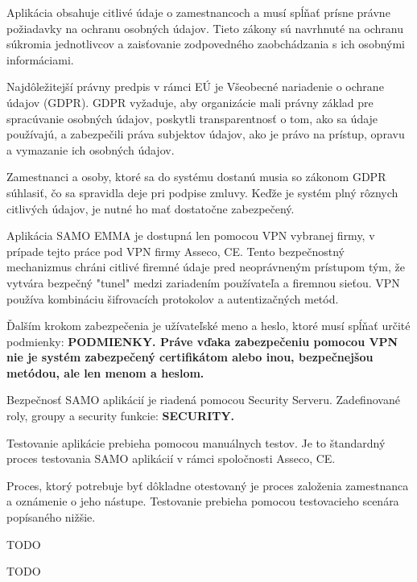
Aplikácia obsahuje citlivé údaje o zamestnancoch a musí spĺňať prísne právne požiadavky na ochranu osobných údajov. Tieto zákony sú navrhnuté na ochranu súkromia jednotlivcov a zaisťovanie zodpovedného zaobchádzania s ich osobnými informáciami.

Najdôležitejší právny predpis v rámci EÚ je Všeobecné nariadenie o ochrane údajov (GDPR). GDPR vyžaduje, aby organizácie mali právny základ pre spracúvanie osobných údajov, poskytli transparentnosť o tom, ako sa údaje používajú, a zabezpečili práva subjektov údajov, ako je právo na prístup, opravu a vymazanie ich osobných údajov.

Zamestnanci a osoby, ktoré sa do systému dostanú musia so zákonom GDPR súhlasiť, čo sa spravidla deje pri podpise zmluvy. Keďže je systém plný rôznych citlivých údajov, je nutné ho mať dostatočne zabezpečený.

Aplikácia SAMO EMMA je dostupná len pomocou VPN vybranej firmy, v prípade tejto práce pod VPN firmy Asseco, CE. Tento bezpečnostný mechanizmus chráni citlivé firemné údaje pred neoprávneným prístupom tým, že vytvára bezpečný "tunel" medzi zariadením používateľa a firemnou sieťou. VPN používa kombináciu šifrovacích protokolov a autentizačných metód.

Ďalším krokom zabezpečenia je užívateľské meno a heslo, ktoré musí spĺňať určité podmienky: \start\bf PODMIENKY\stop. Práve vďaka zabezpečeniu pomocou VPN nie je systém zabezpečený certifikátom alebo inou, bezpečnejšou metódou, ale len menom a heslom.

Bezpečnosť SAMO aplikácií je riadená pomocou Security Serveru. Zadefinované roly, groupy a security funkcie: \start\bf SECURITY\stop.


Testovanie aplikácie prebieha pomocou manuálnych testov. Je to štandardný proces testovania SAMO aplikácií v rámci spoločnosti Asseco, CE. 

Proces, ktorý potrebuje byť dôkladne otestovaný je proces založenia zamestnanca a oznámenie o jeho nástupe. Testovanie prebieha pomocou testovacieho scenára popísaného nižšie.


\TODO
TODO


\TODO
TODO


